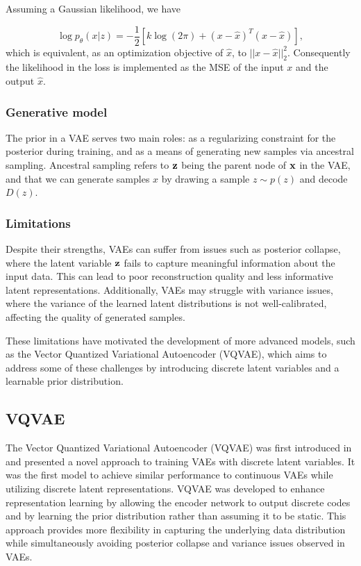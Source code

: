 \documentclass[../../thesis.tex]{subfiles}
\begin{document}
Assuming a Gaussian likelihood, we have

\begin{equation}
    \log p_\theta(x|z) = -\frac12 \left[k\log(2\pi)+ (x-\widehat{x})^T(x-\widehat{x})\right],
\end{equation}
which is equivalent, as an optimization objective of $\widehat{x}$, to $||x-\widehat{x}||_2^2$. Consequently the likelihood in the loss is implemented as the MSE of the input $x$ and the output $\widehat{x}$.

\subsubsection{Generative model}
The prior in a VAE serves two main roles: as a regularizing constraint for the posterior during training, and as a means of generating new samples via ancestral sampling. Ancestral sampling refers to $\mathbf{z}$ being the parent node of $\mathbf{x}$ in the VAE, and that we can generate samples $x$ by drawing a sample $z\sim p(z)$ and decode $D(z)$. 


\subsubsection{Limitations}

Despite their strengths, VAEs can suffer from issues such as posterior collapse, where the latent variable $\mathbf{z}$ fails to capture meaningful information about the input data. This can lead to poor reconstruction quality and less informative latent representations. Additionally, VAEs may struggle with variance issues, where the variance of the learned latent distributions is not well-calibrated, affecting the quality of generated samples.\newline

These limitations have motivated the development of more advanced models, such as the Vector Quantized Variational Autoencoder (VQVAE), which aims to address some of these challenges by introducing discrete latent variables and a learnable prior distribution.


\subsection{VQVAE}
The Vector Quantized Variational Autoencoder (VQVAE) was first introduced in \cite{VQVAE} and presented a novel approach to training VAEs with discrete latent variables. It was the first model to achieve similar performance to continuous VAEs while utilizing discrete latent representations. VQVAE was developed to enhance representation learning by allowing the encoder network to output discrete codes and by learning the prior distribution rather than assuming it to be static. This approach provides more flexibility in capturing the underlying data distribution while simultaneously avoiding posterior collapse and variance issues observed in VAEs.
\end{document}
